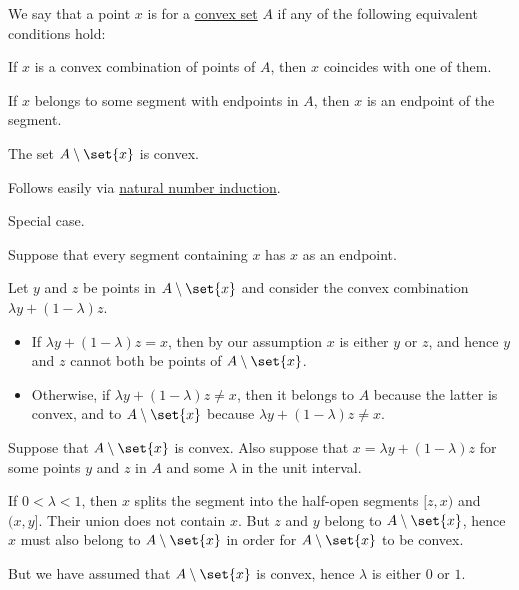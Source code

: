 \begin{definition}\label{def:extremal_point}
  We say that a point \( x \) is  for a \hyperref[def:convex_hull]{convex set} \( A \) if any of the following equivalent conditions hold:

  \begin{thmenum}
     If \( x \) is a convex combination of points of \( A \), then \( x \) coincides with one of them.

     If \( x \) belongs to some segment with endpoints in \( A \), then \( x \) is an endpoint of the segment.

     The set \( A \setminus \set{ x } \) is convex.
  \end{thmenum}
\end{definition}
\begin{defproof}
   Follows easily via \hyperref[rem:induction/peano_arithmetic]{natural number induction}.

   Special case.

   Suppose that every segment containing \( x \) has \( x \) as an endpoint.

  Let \( y \) and \( z \) be points in \( A \setminus \set{ x } \) and consider the convex combination \( \lambda y + (1 - \lambda) z \).

  \begin{itemize}
    \item If \( \lambda y + (1 - \lambda) z = x \), then by our assumption \( x \) is either \( y \) or \( z \), and hence \( y \) and \( z \) cannot both be points of \( A \setminus \set{ x } \).

    \item Otherwise, if \( \lambda y + (1 - \lambda) z \neq x \), then it belongs to \( A \) because the latter is convex, and to \( A \setminus \set{ x } \) because \( \lambda y + (1 - \lambda) z \neq x \).
  \end{itemize}

   Suppose that \( A \setminus \set{ x } \) is convex. Also suppose that \( x = \lambda y + (1 - \lambda) z \) for some points \( y \) and \( z \) in \( A \) and some \( \lambda \) in the unit interval.

  If \( 0 < \lambda < 1 \), then \( x \) splits the segment into the half-open segments \( [z, x) \) and \( (x, y] \). Their union does not contain \( x \). But \( z \) and \( y \) belong to \( A \setminus \set{ x } \), hence \( x \) must also belong to \( A \setminus \set{ x } \) in order for \( A \setminus \set{ x } \) to be convex.

  But we have assumed that \( A \setminus \set{ x } \) is convex, hence \( \lambda \) is either \( 0 \) or \( 1 \).
\end{defproof}

